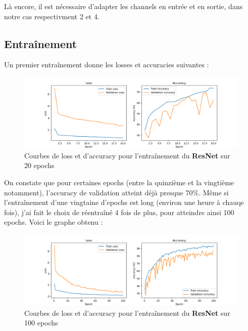 \documentclass{report}
\begin{document}
Là encore, il est nécessaire d'adapter les channels en entrée et en sortie, dans notre cas respectivment 2 et 4.

\newpage

\subsection{Entraînement}

Un premier entraînement donne les losses et accuracies suivantes :

\begin{figure}[ht]
    \centering
    \includegraphics[width=\textwidth]{Sources/Graphiques/1./ResNet/training_results_20_epochs.png}
    \caption{Courbes de loss et d'accuracy pour l'entraînement du \textbf{ResNet} sur 20 epochs}
    \label{fig:training_ResNet_20_epochs}
\end{figure}

On constate que pour certaines epochs (entre la quinzième et la vingtième notamment), l'accuracy de 
validation atteint déjà presque 70\%. Même si l'entraînement d'une vingtaine d'epochs est long
(environ une heure à chauqe fois), j'ai fait le choix de réentraîné 4 fois de plus, pour atteindre 
ainsi 100 epochs. Voici le graphe obtenu :

\begin{figure}[ht]
    \centering
    \includegraphics[width=\textwidth]{Sources/Graphiques/1./ResNet/training_results_100_epochs.png}
    \caption{Courbes de loss et d'accuracy pour l'entraînement du \textbf{ResNet} sur 100 epochs}
    \label{fig:training_ResNet_100_epochs}
\end{figure}
\end{document}
